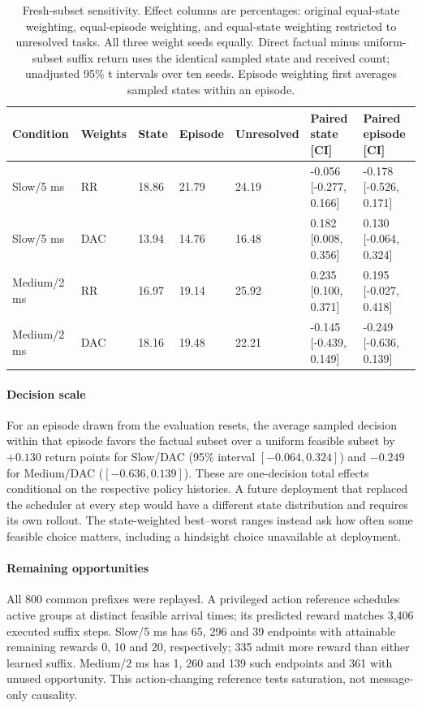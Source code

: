 \documentclass[pdflatex,sn-mathphys-num]{sn-jnl}
\begin{document}
\begin{table}[htbp]\centering\setlength{\tabcolsep}{1.3pt}\footnotesize
\caption{Fresh-subset sensitivity. Effect columns are percentages: original equal-state weighting, equal-episode weighting, and equal-state weighting restricted to unresolved tasks. All three weight seeds equally. Direct factual minus uniform-subset suffix return uses the identical sampled state and received count; unadjusted 95\% t intervals over ten seeds. Episode weighting first averages sampled states within an episode.}\label{tab:robust_strata}
{\footnotesize\setlength{\tabcolsep}{1.3pt}\begin{tabular}{lllllll}\toprule
Condition & Weights & State & Episode & Unresolved & Paired state [CI] & Paired episode [CI]\\\midrule
Slow/5 ms & RR & 18.86 & 21.79 & 24.19 & -0.056 [-0.277, 0.166] & -0.178 [-0.526, 0.171]\\
Slow/5 ms & DAC & 13.94 & 14.76 & 16.48 & 0.182 [0.008, 0.356] & 0.130 [-0.064, 0.324]\\
Medium/2 ms & RR & 16.97 & 19.14 & 25.92 & 0.235 [0.100, 0.371] & 0.195 [-0.027, 0.418]\\
Medium/2 ms & DAC & 18.16 & 19.48 & 22.21 & -0.145 [-0.439, 0.149] & -0.249 [-0.636, 0.139]\\
\bottomrule\end{tabular}}\end{table}

\paragraph{Decision scale}
For an episode drawn from the evaluation resets, the average sampled decision within that episode favors the factual subset over a uniform feasible subset by $+0.130$ return points for Slow/DAC (95\% interval $[-0.064,0.324]$) and $-0.249$ for Medium/DAC ($[-0.636,0.139]$). These are one-decision total effects conditional on the respective policy histories. A future deployment that replaced the scheduler at every step would have a different state distribution and requires its own rollout. The state-weighted best--worst ranges instead ask how often some feasible choice matters, including a hindsight choice unavailable at deployment.

\paragraph{Remaining opportunities}
All 800 common prefixes were replayed. A privileged action reference schedules active groups at distinct feasible arrival times; its predicted reward matches 3,406 executed suffix steps. Slow/5 ms has 65, 296 and 39 endpoints with attainable remaining rewards 0, 10 and 20, respectively; 335 admit more reward than either learned suffix. Medium/2 ms has 1, 260 and 139 such endpoints and 361 with unused opportunity. This action-changing reference tests saturation, not message-only causality.
\FloatBarrier
\end{document}
